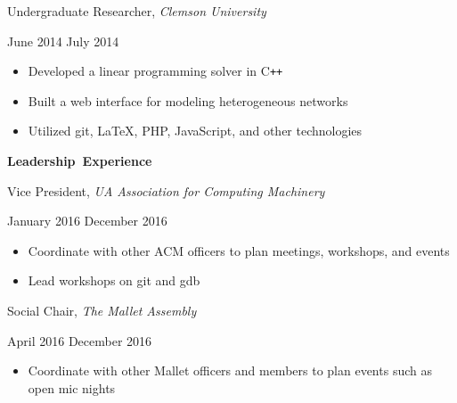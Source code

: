 \documentclass[11pt]{article}
\begin{document}
\begin{minipage}[t]{0.65\textwidth}
\flushleft
Undergraduate Researcher, \textit{Clemson University}\\
\end{minipage}
\begin{minipage}[t]{0.30\textwidth}
\flushright
June 2014 \space \textemdash \space July 2014\\
\end{minipage}

\begin{itemize}
  \item Developed a linear programming solver in C\texttt{++}
  \item Built a web interface for modeling heterogeneous networks
  \item Utilized git, \LaTeX, PHP, JavaScript, and other technologies
\end{itemize}

\vspace{0.8em}
\hbox{\large \textbf{Leadership Experience}}

\vspace{0.4em}
\begin{minipage}[t]{0.65\textwidth}
\flushleft
Vice President, \textit{UA Association for Computing Machinery}\\
\end{minipage}
\begin{minipage}[t]{0.30\textwidth}
\flushright
January 2016 \space \textemdash \space December 2016\\
\end{minipage}

\begin{itemize}
  \item Coordinate with other ACM officers to plan meetings, workshops, and events
  \item Lead workshops on git and gdb
\end{itemize}

\vspace{0.4em}
\begin{minipage}[t]{0.65\textwidth}
\flushleft
Social Chair, \textit{The Mallet Assembly}\\
\end{minipage}
\begin{minipage}[t]{0.30\textwidth}
\flushright
April 2016 \space \textemdash \space December 2016\\
\end{minipage}

\begin{itemize}
  \item Coordinate with other Mallet officers and members to plan events such as open mic nights
\end{itemize}
\end{document}
